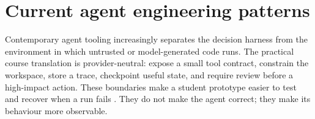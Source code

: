 \section{Current agent engineering patterns}
Contemporary agent tooling increasingly separates the decision harness from the environment in which untrusted or model-generated code runs. The practical course translation is provider-neutral: expose a small tool contract, constrain the workspace, store a trace, checkpoint useful state, and require review before a high-impact action. These boundaries make a student prototype easier to test and recover when a run fails \citep{openaiagents2026}. They do not make the agent correct; they make its behaviour more observable.

